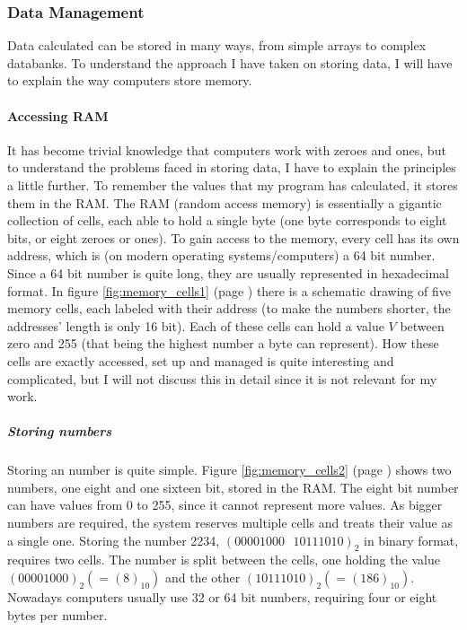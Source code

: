 \documentclass[10pt,a4paper,titlepage]{article}
\begin{document}
	\subsubsection{Data Management}\label{sec:data_management}
	Data calculated can be stored in many ways, from simple arrays to complex databanks. To understand the approach I have taken on storing data, I will have to explain the way computers store memory.
	\paragraph{Accessing RAM}
	It has become trivial knowledge that computers work with zeroes and ones, but to understand the problems faced in storing data, I have to explain the principles a little further. To remember the values that my program has calculated, it stores them in the RAM. The RAM (random access memory) is essentially a gigantic collection of cells, each able to hold a single byte (one byte corresponds to eight bits, or eight zeroes or ones). To gain access to the memory, every cell has its own address, which is (on modern operating systems/computers) a 64 bit number. Since a 64 bit number is quite long, they are usually represented in hexadecimal format. In figure \ref{fig:memory_cells1} (page \pageref{fig:memory_cells1}) there is a schematic drawing of five memory cells, each labeled with their address (to make the numbers shorter, the addresses' length is only 16 bit). Each of these cells can hold a value $V$ between zero and 255 (that being the highest number a byte can represent). How these cells are exactly accessed, set up and managed is quite interesting and complicated, but I will not discuss this in detail since it is not relevant for my work.\\
	\subparagraph{Storing numbers}
	Storing an number is quite simple. Figure \ref{fig:memory_cells2} (page \pageref{fig:memory_cells2}) shows two numbers, one eight and one sixteen bit, stored in the RAM. The eight bit number can have values from 0 to 255, since it cannot represent more values. As bigger numbers are required, the system reserves multiple cells and treats their value as a single one. Storing the number 2234, \((00001000\text{ }10111010)_2\) in binary format, requires two cells. The number is split between the cells, one holding the value \((00001000)_2 (= (8)_{10})\) and the other \((10111010)_2(=(186)_{10})\). Nowadays computers usually use 32 or 64 bit numbers, requiring four or eight bytes per number.
	
\end{document}
